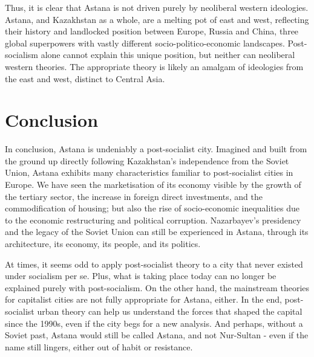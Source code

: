 \documentclass{article}
\begin{document}
Thus, it is clear that Astana is not driven purely by neoliberal western ideologies. Astana, and Kazakhstan as a whole, are a melting pot of east and west, reflecting their history and landlocked position between Europe, Russia and China, three global superpowers with vastly different socio-politico-economic landscapes. Post-socialism alone cannot explain this unique position, but neither can neoliberal western theories. The appropriate theory is likely an amalgam of ideologies from the east and west, distinct to Central Asia.

\section{Conclusion}

In conclusion, Astana is undeniably a post-socialist city. Imagined and built from the ground up directly following Kazakhstan's independence from the Soviet Union, Astana exhibits many characteristics familiar to post-socialist cities in Europe. We have seen the marketisation of its economy visible by the growth of the tertiary sector, the increase in foreign direct investments, and the commodification of housing; but also the rise of socio-economic inequalities due to the economic restructuring and political corruption. Nazarbayev's presidency and the legacy of the Soviet Union can still be experienced in Astana, through its architecture, its economy, its people, and its politics.


At times, it seems odd to apply post-socialist theory to a city that never existed under socialism per se. Plus, what is taking place today can no longer be explained purely with post-socialism. On the other hand, the mainstream theories for capitalist cities are not fully appropriate for Astana, either. In the end, post-socialist urban theory can help us understand the forces that shaped the capital since the 1990s, even if the city begs for a new analysis.
And perhaps, without a Soviet past, Astana would still be called Astana, and not Nur-Sultan - even if the name still lingers, either out of habit or resistance.

\pagebreak

\printbibliography
\end{document}
